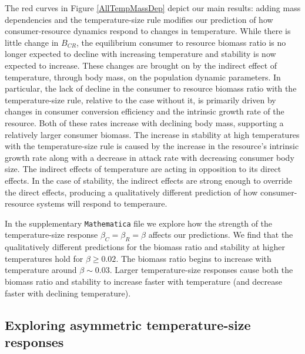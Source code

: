 \documentclass[11pt]{article}
\begin{document}
The red curves in Figure \ref{AllTempMassDep} depict our main results: adding mass dependencies and the temperature-size rule modifies our prediction of how consumer-resource dynamics respond to changes in temperature.
While there is little change in $B_{CR}$, the equilibrium consumer to resource biomass ratio is no longer expected to decline with increasing temperature and stability is now expected to increase.
These changes are brought on by the indirect effect of temperature, through body mass, on the population dynamic parameters.
In particular, the lack of decline in the consumer to resource biomass ratio with the temperature-size rule, relative to the case without it, is primarily driven by changes in consumer conversion efficiency and the intrinsic growth rate of the resource.
Both of these rates increase with declining body mass, supporting a relatively larger consumer biomass. 
The increase in stability at high temperatures with the temperature-size rule is caused by the increase in the resource's intrinsic growth rate along with a decrease in attack rate with decreasing consumer body size. 
The indirect effects of temperature are acting in opposition to its direct effects.
In the case of stability, the indirect effects are strong enough to override the direct effects, producing a qualitatively different prediction of how consumer-resource systems will respond to temperaure.

In the supplementary \texttt{Mathematica} file we explore how the strength of the temperature-size response $\beta_C = \beta_R = \beta$ affects our predictions. 
We find that the qualitatively different predictions for the biomass ratio and stability at higher temperatures hold for $\beta\geq0.02$.
The biomass ratio begins to increase with temperature around $\beta\sim0.03$.
Larger temperature-size responses cause both the biomass ratio and stability to increase faster with temperature (and decrease faster with declining temperature).

\subsection*{Exploring asymmetric temperature-size responses}
\end{document}
